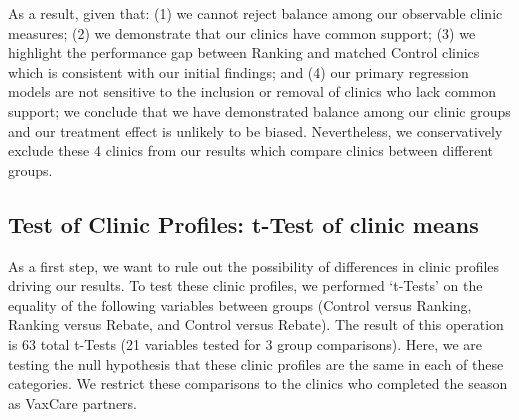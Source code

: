 As a result, given that: (1) we cannot reject balance among our observable clinic measures; (2) we demonstrate that our clinics have common support; (3) we highlight the performance gap between Ranking and matched Control clinics which is consistent with our initial findings; and (4) our primary regression models are not sensitive to the inclusion or removal of clinics who lack common support; we conclude that we have demonstrated balance among our clinic groups and our treatment effect is unlikely to be biased. Nevertheless, we conservatively exclude these 4 clinics from our results which compare clinics between different groups.

\subsection{Test of Clinic Profiles: t-Test of clinic means}
As a first step, we want to rule out the possibility of differences in clinic profiles driving our results. To test these clinic profiles, we performed ‘t-Tests’ on the equality of the following variables between groups (Control versus Ranking, Ranking versus Rebate, and Control versus Rebate). The result of this operation is 63 total t-Tests (21 variables tested for 3 group comparisons). Here, we are testing the null hypothesis that these clinic profiles are the same in each of these categories. We restrict these comparisons to the clinics who completed the season as VaxCare partners. 

